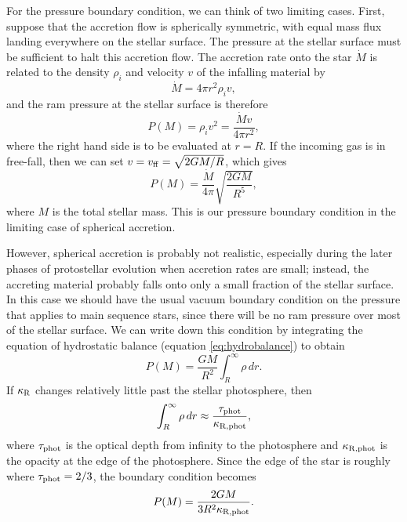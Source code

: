For the pressure boundary condition, we can think of two limiting cases. First, suppose that the accretion flow is spherically symmetric, with equal mass flux landing everywhere on the stellar surface. The pressure at the stellar surface must be sufficient to halt this accretion flow. The accretion rate onto the star $\dot{M}$ is related to the density $\rho_i$ and velocity $v$ of the infalling material by
\begin{equation}
\dot{M} = 4\pi r^2 \rho_i v,
\end{equation}
and the ram pressure at the stellar surface is therefore
\begin{equation}
P(M) = \rho_i v^2 = \frac{\dot{M} v}{4\pi r^2},
\end{equation}
where the right hand side is to be evaluated at $r=R$. If the incoming gas is in free-fall, then we can set $v = v_{\rm ff} = \sqrt{2GM/R}$, which gives
\begin{equation}
\label{pbound1}
P(M) = \frac{\dot{M}}{4\pi} \sqrt{\frac{2 G M}{R^5}},
\end{equation}
where $M$ is the total stellar mass. This is our pressure boundary condition in the limiting case of spherical accretion.

However, spherical accretion is probably not realistic, especially during the later phases of protostellar evolution when accretion rates are small; instead, the accreting material probably falls onto only a small fraction of the stellar surface. In this case we should have the usual vacuum boundary condition on the pressure that applies to main sequence stars, since there will be no ram pressure over most of the stellar surface. We can write down this condition by integrating the equation of hydrostatic balance (equation \ref{eq:hydrobalance}) to obtain 
\begin{equation}
P(M) = \frac{G M}{R^2} \int_{R}^{\infty} \rho \, dr.
\end{equation}
If $\kappa_{\rm R}$ changes relatively little past the stellar photosphere, then 
\begin{equation}
\int _{R}^{\infty} \rho \, dr \approx \frac{\tau_{\rm phot}}{\kappa_{\rm R, phot}},
\end{equation}
where $\tau_{\rm phot}$ is the optical depth from infinity to the photosphere and $\kappa_{\rm R, phot}$ is the opacity at the edge of the photosphere. Since the edge of the star is roughly where $\tau_{\rm phot} = 2/3$, the boundary condition becomes
\begin{equation}
\label{pbound2}
P(M) = \frac{2 G M}{3 R^2 \kappa_{\rm R, phot}}.
\end{equation}

